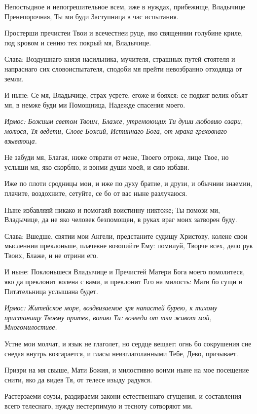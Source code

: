Непостыдное и непогрешительное всем, иже в нуждах, прибежище, Владычице Пренепорочная, Ты ми буди Заступница в час испытания. 

Простерши пречистеи Твои и всечестнеи руце, яко священнии голубине криле, под кровом и сению тех покрый мя, Владычице. 

Слава: Воздушнаго князя насильника, мучителя, страшных путей стоятеля и напраснаго сих словоиспытателя, сподоби мя прейти невозбранно отходяща от земли. 

И ныне: Се мя, Владычице, страх усрете, егоже и бояхся: се подвиг велик объят мя, в немже буди ми Помощница, Надежде спасения моего.




\itshape Ирмос:\normalfont{} Божиим светом Твоим, Блаже, утренюющих Ти души любовию озари, молюся, Тя ведети, Слове Божий, Истиннаго Бога, от мрака греховнаго взывающа. 

Не забуди мя, Благая, ниже отврати от мене, Твоего отрока, лице Твое, но услыши мя, яко скорблю, и вонми души моей, и сию избави. 

Иже по плоти сродницы мои, и иже по духу братие, и друзи, и обычнии знаемии, плачите, воздохните, сетуйте, се бо от вас ныне разлучаюся. 

Ныне избавляяй никако и помогаяй воистинну никтоже; Ты помози ми, Владычице, да не яко человек безпомощен, в руках враг моих затворен буду. 

Слава: Вшедше, святии мои Ангели, предстаните судищу Христову, колене свои мысленнии преклоньше, плачевне возопийте Ему: помилуй, Творче всех, дело рук Твоих, Блаже, и не отрини его. 

И ныне: Поклоньшеся Владычице и Пречистей Матери Бога моего помолитеся, яко да преклонит колена с вами, и преклонит Его на милость: Мати бо сущи и Питательница услышана будет.




\itshape Ирмос:\normalfont{} Житейское море, воздвизаемое зря напастей бурею, к тихому пристанищу Твоему притек, вопию Ти: возведи от тли живот мой, Многомилостиве. 

Устне мои молчат, и язык не глаголет, но сердце вещает: огнь бо сокрушения сие снедая внутрь возгарается, и гласы неизглаголанными Тебе, Дево, призывает. 

Призри на мя свыше, Мати Божия, и милостивно вонми ныне на мое посещение снити, яко да видев Тя, от телесе изыду радуяся. 

Растерзаеми соузы, раздираеми закони естественнаго сгущения, и составления всего телеснаго, нужду нестерпимую и тесноту сотворяют ми. 

